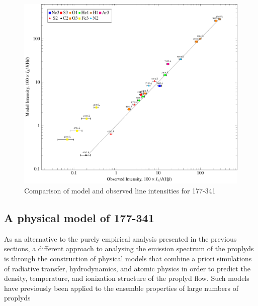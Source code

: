 \documentclass[useAMS,usenatbib]{mn2e}
\begin{document}
\begin{figure}
  \centering
  \includegraphics{ratios-figure-figure0}
  \caption{Comparison of model and observed line intensities for 177-341}
  \label{fig:model}
\end{figure}
\addtocounter{section}{6}
\addtocounter{subsection}{2}
\subsection{A physical model of 177-341}
As an alternative to the purely empirical analysis presented in the previous sections, a different approach to analysing the emission spectrum of the proplyds is through the construction of physical models that combine a priori simulations of radiative transfer, hydrodynamics, and atomic physics in order to predict the density, temperature, and ionization structure of the proplyd flow.  Such models have previously been applied to the ensemble properties of large numbers of proplyds 



\end{document}
